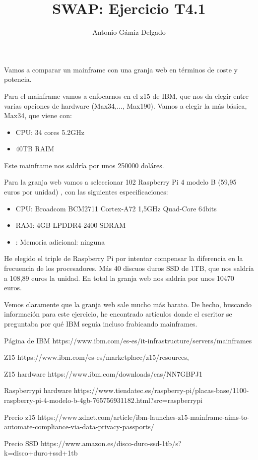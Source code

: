 \documentclass[12pt]{article}
\title{SWAP: Ejercicio T4.1}
\author{
        Antonio Gámiz Delgado
}
\begin{document}
\maketitle

Vamos a comparar un mainframe con una granja web en términos de coste y potencia. 

Para el mainframe vamos a enfocarnos en el z15 de IBM, que nos da elegir entre varias opciones de hardware (Max34,..., Max190). Vamos a elegir la más básica, Max34, que viene con:

\begin{itemize}
\item CPU: 34 cores 5.2GHz
\item 40TB RAIM
\end{itemize}

Este mainframe nos saldría por unos 250000 doláres.

Para la granja web vamos a seleccionar 102 Raspberry Pi 4 modelo B (59,95 euros por unidad) , con las siguientes especificaciones:

\begin{itemize}
\item CPU: Broadcom BCM2711 Cortex-A72 1,5GHz Quad-Core 64bits
\item RAM: 4GB LPDDR4-2400 SDRAM
\item: Memoria adicional: ninguna
\end{itemize}

He elegido el triple de Raspberry Pi por intentar compensar la diferencia en la frecuencia de los procesadores. Más 40 discuos duros SSD de 1TB, que nos saldría a 108,89 euros la unidad. En total la granja web nos saldría por unos 10470 euros.

Vemos claramente que la granja web sale mucho más barato. De hecho, buscando información para este ejercicio, he encontrado artículos donde el escritor se preguntaba por qué IBM seguía incluso frabicando mainframes.
\medskip

\begin{thebibliography}{9}
Página de IBM
https://www.ibm.com/es-es/it-infrastructure/servers/mainframes

Z15
https://www.ibm.com/es-es/marketplace/z15/resources,

Z15 hardware
https://www.ibm.com/downloads/cas/NN7GBPJ1

Raspberrypi hardware
https://www.tiendatec.es/raspberry-pi/placas-base/1100-raspberry-pi-4-modelo-b-4gb-765756931182.html?src=raspberrypi

Precio z15 https://www.zdnet.com/article/ibm-launches-z15-mainframe-aims-to-automate-compliance-via-data-privacy-passports/

Precio SSD
https://www.amazon.es/disco-duro-ssd-1tb/s?k=disco+duro+ssd+1tb

\end{thebibliography}
\end{document}
